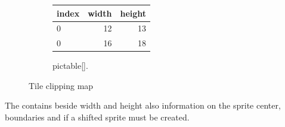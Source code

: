 \documentclass[book.tex]{subfiles}
\begin{document}
\begin{figure}[H]
\begin{subfigure}{.5\textwidth}
  \centering
  \begin{table}[H]
  \begin{tabularx}{0.8\textwidth}[c]{lrr}
  \hline
  \textbf{index} & \textbf{width} & \textbf{height}   \\ \hline
  0             & 12          & 13    \\
  0             & 16          & 18    \\

  \end{tabularx}
  \end{table}
  \caption{pictable[].}
  \label{picttable}
\end{subfigure}%
\begin{subfigure}{.5\textwidth}
  \centering
\end{subfigure}
\caption{Tile clipping map}
\label{fig:clip_tinf}
\end{figure}


The  contains beside width and height also information on the sprite center, boundaries and if a shifted sprite must be created.\\

 
\end{document}
